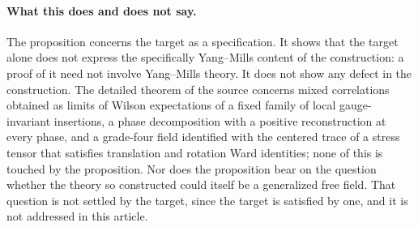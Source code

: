 \paragraph{What this does and does not say.}
The proposition concerns the target as a specification. It shows that the
target alone does not express the specifically Yang--Mills content of the
construction: a proof of it need not involve Yang--Mills theory. It does not
show any defect in the construction. The detailed theorem of the source
concerns mixed correlations obtained as limits of Wilson expectations of a
fixed family of local gauge-invariant insertions, a phase decomposition with
a positive reconstruction at every phase, and a grade-four field identified
with the centered trace of a stress tensor that satisfies translation and
rotation Ward identities; none of this is touched by the proposition. Nor
does the proposition bear on the question whether the theory so constructed
could itself be a generalized free field. That question is not settled by
the target, since the target is satisfied by one, and it is not addressed in
this article.
